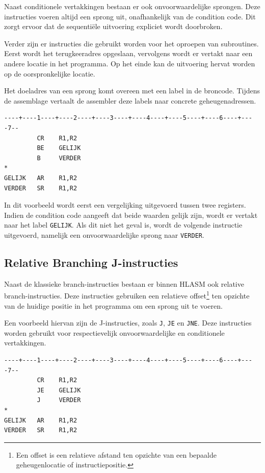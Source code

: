 Naast conditionele vertakkingen bestaan er ook onvoorwaardelijke sprongen. Deze instructies voeren altijd een sprong uit, onafhankelijk van de condition code. Dit zorgt ervoor dat de sequentiële uitvoering expliciet wordt doorbroken.

Verder zijn er instructies die gebruikt worden voor het oproepen van subroutines. Eerst wordt het terugkeeradres opgeslaan, vervolgens wordt er vertakt naar een andere locatie in het programma. Op het einde kan de uitvoering hervat worden op de oorspronkelijke locatie.

\newpage

Het doeladres van een sprong komt overeen met een label in de broncode. Tijdens de assemblage vertaalt de assembler deze labels naar concrete geheugenadressen. 

\begin{lstlisting}[language=HLASM, caption={Voorbeeld van vertakkingen in HLASM.}]
----+----1----+----2----+----3----+----4----+----5----+----6----+----7--
         CR    R1,R2
         BE    GELIJK
         B     VERDER
*         
GELIJK   AR    R1,R2
VERDER   SR    R1,R2
\end{lstlisting}

In dit voorbeeld wordt eerst een vergelijking uitgevoerd tussen twee registers. Indien de condition code aangeeft dat beide waarden gelijk zijn, wordt er vertakt naar het label \texttt{GELIJK}. Als dit niet het geval is, wordt de volgende instructie uitgevoerd, namelijk een onvoorwaardelijke sprong naar \texttt{VERDER}.

\subsection{Relative Branching J-instructies}

Naast de klassieke branch-instructies bestaan er binnen HLASM ook relative branch-instructies. Deze instructies gebruiken een relatieve offset\footnote{Een offset is een relatieve afstand ten opzichte van een bepaalde geheugenlocatie of instructiepositie.} ten opzichte van de huidige positie in het programma om een sprong uit te voeren.

Een voorbeeld hiervan zijn de J-instructies, zoals \texttt{J}, \texttt{JE} en \texttt{JNE}. Deze instructies worden gebruikt voor respectievelijk onvoorwaardelijke en conditionele vertakkingen.

\begin{lstlisting}[language=HLASM, caption={Voorbeeld van relative branching met J-instructies.}]
----+----1----+----2----+----3----+----4----+----5----+----6----+----7--
         CR    R1,R2
         JE    GELIJK
         J     VERDER
*    
GELIJK   AR    R1,R2
VERDER   SR    R1,R2
\end{lstlisting}


